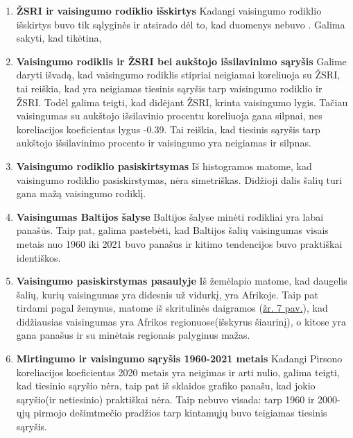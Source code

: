 \begin{enumerate}
    \item \textbf{ŽSRI ir vaisingumo rodiklio išskirtys}
    Kadangi vaisingumo rodiklio išskirtys buvo tik sąlyginės ir atsirado dėl to, kad duomenys nebuvo . Galima sakyti, kad tikėtina, 

    \item \textbf{Vaisingumo rodiklis ir ŽSRI bei aukštojo išsilavinimo sąryšis}
    Galime daryti išvadą, kad vaisingumo rodiklis stipriai neigiamai koreliuoja su ŽSRI, tai reiškia, kad yra neigiamas tiesinis sąryšis tarp vaisingumo rodiklio ir ŽSRI. Todėl galima teigti, kad didėjant ŽSRI, krinta vaisingumo lygis.
    Tačiau vaisingumas su aukštojo išsilavinio procentu koreliuoja gana silpnai, nes koreliacijos koeficientas lygus -0.39. Tai reiškia, kad tiesinis sąryšis tarp aukštojo išsilavinimo procento ir vaisingumo yra neigiamas ir silpnas.

    \item \textbf{Vaisingumo rodiklio pasiskirtsymas}
    Iš histogramos matome, kad vaisingumo rodiklio pasiskirstymas, nėra simetriškas. Didžioji dalis šalių turi gana mažą vaisingumo rodiklį. 

    \item \textbf{Vaisingumas Baltijos šalyse}
    Baltijos šalyse minėti rodikliai yra labai panašūs. Taip pat, galima pastebėti, kad Baltijos šalių vaisingumas visais metais nuo 1960 iki 2021 buvo panašus ir kitimo tendencijos buvo praktiškai identiškos.

    \item \textbf{Vaisingumo pasiskirstymas pasaulyje}
    Iš žemėlapio matome, kad daugelis šalių, kurių vaisingumas yra didesnis už vidurkį, yra Afrikoje.
    Taip pat tirdami pagal žemynus, matome iš skritulinės daigramos (\hyperlink{pie}{žr. 7 pav.}), kad didžiausias vaisingumas yra Afrikos regionuose(išskyrus šiaurinį), o kitose yra gana panašus ir su minėtais regionais palyginus mažas.

    \item \textbf{Mirtingumo ir vaisingumo sąryšis 1960-2021 metais}
    Kadangi Pirsono koreliacijos koeficientas 2020 metais yra neigimas ir arti nulio, galima teigti, kad tiesinio sąryšio nėra, taip pat iš sklaidos grafiko panašu, kad jokio sąryšio(ir netiesinio) praktiškai nėra. Taip nebuvo visada: tarp 1960 ir 2000-ųjų pirmojo dešimtmečio pradžios tarp kintamųjų buvo teigiamas tiesinis sąryšis.
\end{enumerate}